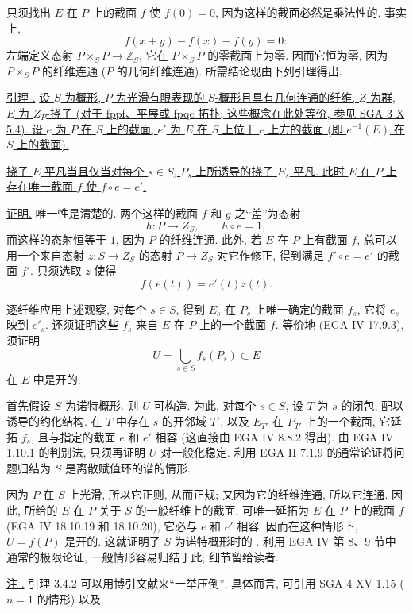 只须找出 $E$ 在 $P$ 上的截面 $f$ 使 $f(0)=0$, 因为这样的截面必然是乘法性的. 事实上,
\[
 f(x+y)-f(x)-f(y)=0:
\]
左端定义态射 $P\times_S P\longrightarrow\mathbb Z_S$, 它在 $P\times_S P$ 的零截面上为零. 因而它恒为零, 因为 $P\times_S P$ 的纤维连通 ($P$ 的几何纤维连通). 所需结论现由下列引理得出.

\medskip
\noindent\underline{引理 .} \underline{设 $S$ 为概形, $P$ 为光滑有限表现的 $S$-概形且具有几何连通的纤维, $Z$ 为群, $E$ 为 $Z_P$-挠子 (对于 fppf、平展或 fpqc 拓扑; 这些概念在此处等价, 参见 SGA 3 X 5.4). 设 $e$ 为 $P$ 在 $S$ 上的截面, $e'$ 为 $E$ 在 $S$ 上位于 $e$ 上方的截面 (即 $e^{-1}(E)$ 在 $S$ 上的截面).}

\underline{挠子 $E$ 平凡当且仅当对每个 $s\in S$, $P_s$ 上所诱导的挠子 $E_s$ 平凡. 此时 $E$ 在 $P$ 上存在唯一截面 $f$ 使 $f\circ e=e'$.}

\noindent\underline{证明.} 唯一性是清楚的. 两个这样的截面 $f$ 和 $g$ 之“差”为态射
\[
 h:P\longrightarrow Z_S,
 \qquad h\circ e=1,
\]
而这样的态射恒等于 $1$, 因为 $P$ 的纤维连通. 此外, 若 $E$ 在 $P$ 上有截面 $f$, 总可以用一个来自态射 $z:S\longrightarrow
Z_S$ 的态射 $P\longrightarrow Z_S$ 对它作修正, 得到满足 $f'\circ e=e'$ 的截面 $f'$. 只须选取 $z$ 使得
\[
 f(e(t))=e'(t)z(t).
\]

逐纤维应用上述观察, 对每个 $s\in S$, 得到 $E_s$ 在 $P_s$ 上唯一确定的截面 $f_s$, 它将 $e_s$ 映到 $e'_s$. 还须证明这些 $f_s$ 来自 $E$ 在 $P$ 上的一个截面 $f$. 等价地 (EGA IV 17.9.3), 须证明
\[
 U=\bigcup_{s\in S}f_s(P_s)\subset E
\]
在 $E$ 中是开的.

首先假设 $S$ 为诺特概形. 则 $U$ 可构造. 为此, 对每个 $s\in S$, 设 $T$ 为 $s$ 的闭包, 配以诱导的约化结构. 在 $T$ 中存在 $s$ 的开邻域 $T'$, 以及 $E_{T'}$ 在 $P_{T'}$ 上的一个截面, 它延拓 $f_s$, 且与指定的截面 $e$ 和 $e'$ 相容 (这直接由 EGA IV 8.8.2 得出). 由 EGA IV 1.10.1 的判别法, 只须再证明 $U$ 对一般化稳定. 利用 EGA II 7.1.9 的通常论证将问题归结为 $S$ 是离散赋值环的谱的情形.

因为 $P$ 在 $S$ 上光滑, 所以它正则, 从而正规; 又因为它的纤维连通, 所以它连通. 因此, 所给的 $E$ 在 $P$ 关于 $S$ 的一般纤维上的截面, 可唯一延拓为 $E$ 在 $P$ 上的截面 $f$ (EGA IV 18.10.19 和 18.10.20), 它必与 $e$ 和 $e'$ 相容. 因而在这种情形下, $U=f(P)$ 是开的. 这就证明了 $S$ 为诺特概形时的 . 利用 EGA IV 第 8、9 节中通常的极限论证, 一般情形容易归结于此; 细节留给读者.

\medskip
\noindent\underline{注 .} 引理 3.4.2 可以用博引文献来“一举压倒”, 具体而言, 可引用 SGA 4 XV 1.15 ($n=1$ 的情形) 以及 .


